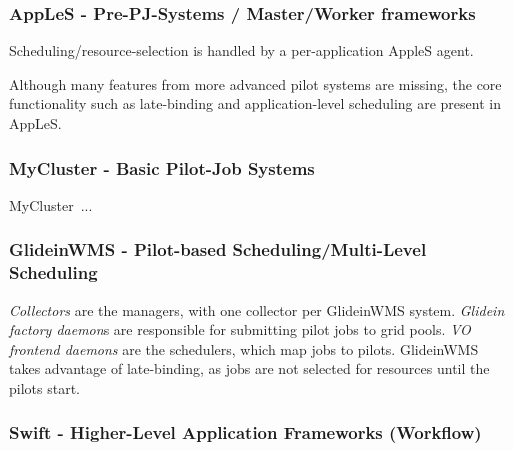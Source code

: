 \documentclass{sig-alternate}
\begin{document}
\subsubsection{AppLeS - Pre-PJ-Systems / Master/Worker frameworks}

Scheduling/resource-selection is handled by a per-application AppleS agent.

Although many features from more advanced pilot systems are missing, the core
\pilotjob functionality such as late-binding and 
application-level scheduling are present in AppLeS.

\subsubsection{MyCluster - Basic Pilot-Job Systems}
MyCluster~\cite{1652061}...

\subsubsection{GlideinWMS - Pilot-based Scheduling/Multi-Level Scheduling}
\textit{Collectors} are the managers, with one collector per
GlideinWMS system.
\textit{Glidein factory daemon}s are responsible for
submitting pilot jobs to grid pools.
\textit{VO frontend daemons} are the schedulers, which map jobs
to pilots.  GlideinWMS takes advantage of late-binding, as
jobs are not selected for resources until the pilots start.

\subsubsection{Swift - Higher-Level Application Frameworks (Workflow)}
\end{document}
